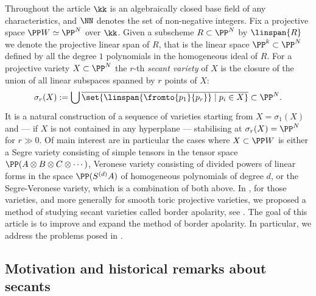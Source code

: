 \documentclass[12pt,a4paper]{article}
\begin{document}
Throughout the article $\kk$ is
an algebraically closed base field of any characteristics, and $\NN$ denotes the set of non-negative integers.
Fix a projective space $\PP W \simeq \PP^N$ over $\kk$.
Given a subscheme $R\subset \PP^N$ by $\linspan{R}$ we denote the projective linear span of $R$, that is the linear space $\PP^k\subset \PP^N$
defined by all the degree $1$ polynomials in the homogeneous ideal of $R$.
For a projective variety $X \subset \PP^N$ the $r$-th \emph{secant variety} of $X$
  is the closure of the union of all linear subspaces spanned by $r$ points of $X$:
\[
  \sigma_r(X) := \bigcup \overline{\set{\linspan{\fromto{p_1}{p_r}}  \mid p_i \in X}} \subset \PP^N.
\]
It is a natural construction of a sequence of varieties starting from $X=\sigma_1(X)$ and
--- if $X$ is not contained in any hyperplane ---  stabilising at $\sigma_r(X)=\PP^N$ for $r\gg0$.
Of main interest are in particular the cases where $X\subset \PP W$ is either a Segre variety consisting of simple tensors in the tensor space $\PP (A\otimes B \otimes C \otimes\dotsb)$, Veronese variety consisting of divided powers of linear forms in the space $\PP(S^{(d)} A)$ of homogeneous polynomials of degree $d$, or the Segre-Veronese variety, which is a combination of both above.
In \cite{nisiabu_jabu_border_apolarity}, for those varieties,
and more generally for smooth toric projective varieties,
we proposed a method of studying secant varieties called border apolarity, see \cite[Thms~1.2, 3.15, 4.3]{nisiabu_jabu_border_apolarity}.
The goal of this article  is to improve and  expand the method of border apolarity.
In particular, we address the problems posed in
\cite[\S7.2, \S7.4, \S7.5]{nisiabu_jabu_border_apolarity}.


\subsection{Motivation and historical remarks about secants}
\end{document}
